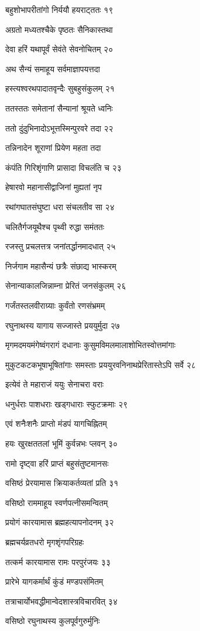 बहुशोभापरीतांगो निर्ययौ हयराट्ततः १९

अग्रतो मध्यतश्चैके पृष्ठतः सैनिकास्तथा

देवा हरिं यथापूर्वं सेवंते सेवनोचितम् २०

अथ सैन्यं समाहूय सर्वमाज्ञापयत्तदा

हस्त्यश्वरथपादातवृन्दैः सुबहुसंकुलम् २१

ततस्ततः समेतानां सैन्यानां श्रूयते ध्वनिः

ततो दुंदुभिनादोऽभूत्तस्मिन्पुरवरे तदा २२

तन्निनादेन शूराणां प्रियेण महता तदा

कंपंति गिरिशृंगाणि प्रासादा विचलंति च २३

हेषारवो महानासीद्वाजिनां मुह्यतां नृप

रथांगघातसंघुष्टा धरा संचलतीव सा २४

चलितैर्गजयूथैश्च पृथ्वी रुद्धा समंततः

रजस्तु प्रचलत्तत्र जनांतर्द्धानमादधात् २५

निर्जगाम महासैन्यं छत्रैः संछाद्य भास्करम्

सेनान्याकालजिन्नाम्ना प्रेरितं जनसंकुलम् २६

गर्जंतस्तलवीराग्र्याः कुर्वंतो रणसंभ्रमम्

रघुनाथस्य यागाय सज्जास्ते प्रययुर्मुदा २७

मृगमदमयमंगेष्वंगरागं दधानाः कुसुमविमलमालाशोभितस्वोत्तमांगाः

मुकुटकटकभूषाभूषितांगाः समस्ताः प्रययुरवनिनाथप्रेरितास्तेऽपि सर्वे २८

इत्येवं ते महाराजं ययुः सेनाचरा वराः

धनुर्धराः पाशधराः खड्गधाराः स्फुटक्रमाः २९

एवं शनैःशनैः प्राप्तो मंडपं यागचिह्नितम्

हयः खुरक्षततलां भूमिं कुर्वन्नभः प्लवन् ३०

रामो दृष्ट्वा हरिं प्राप्तं बहुसंतुष्टमानसः

वसिष्ठं प्रेरयामास क्रियाकर्तव्यतां प्रति ३१

वसिष्ठो राममाहूय स्वर्णपत्नीसमन्वितम्

प्रयोगं कारयामास ब्रह्महत्यापनोदनम् ३२

ब्रह्मचर्यव्रतधरो मृगशृंगपरिग्रहः

तत्कर्म कारयामास रामः परपुरंजयः ३३

प्रारेभे यागकर्मार्थं कुंडं मण्डपसंमितम्

तत्राचार्योभवद्धीमान्वेदशास्त्रविचारवित् ३४

वसिष्ठो रघुनाथस्य कुलपूर्वगुरुर्मुनिः


